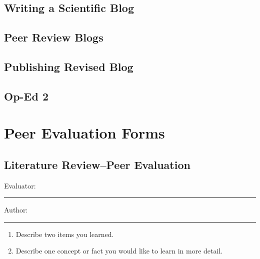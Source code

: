 \documentclass{article}\usepackage[]{graphicx}\usepackage[]{color}
\begin{document}


\subsection{Writing a Scientific Blog}



\subsection{Peer Review Blogs}



\subsection{Publishing Revised Blog}



\subsection{Op-Ed 2}



\clearpage
\newpage
\section{Peer Evaluation Forms}

\subsection{Literature Review--Peer Evaluation}

\bigskip
Evaluator: \rule{7cm}{0.4pt}

\bigskip

\noindent Author: \rule{7cm}{0.4pt}

\begin{enumerate}
 \setlength\itemsep{4em}
  \item Describe two items you learned.
  \item Describe one concept or fact you would like to learn in more detail.
\end{enumerate}
\end{document}
